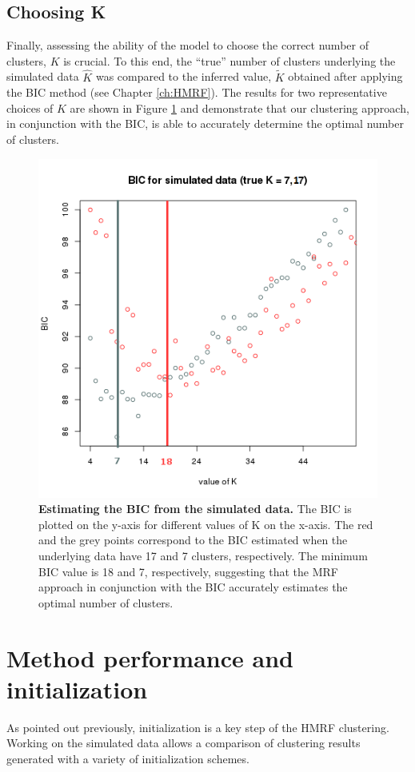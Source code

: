 	\subsection{Choosing K}
	
Finally, assessing the ability of the model to choose the correct number of clusters, $K$ is crucial. To this end, the ``true'' number of clusters underlying the simulated data $\hat{K}$ was compared to the inferred value, $\widetilde{K}$ obtained after applying the BIC method (see Chapter \ref{ch:HMRF}). The results for two representative choices of $K$ are shown in Figure \ref{fig:simulatedK} and demonstrate that our clustering approach, in conjunction with the BIC, is able to accurately determine the optimal number of clusters.\\

	\begin{figure}[H]
\centerline{\includegraphics[width=0.8\linewidth]{gfx/chapter5/simulated_k.png}}
\caption{{\bf Estimating the BIC from the simulated data.} The BIC is plotted on the y-axis for different values of K on the x-axis. The red and the grey points correspond to the BIC estimated when the underlying data have 17 and 7 clusters, respectively. The minimum BIC value is 18 and 7, respectively, suggesting that the MRF approach in conjunction with the BIC accurately estimates the optimal number of clusters.}
\label{fig:simulatedK}
	\end{figure}

\section{Method performance and initialization}\label{sec:method_comparison}
As pointed out previously, initialization is a key step of the HMRF clustering. Working on the simulated data allows a comparison of clustering results generated with a variety of initialization schemes.

